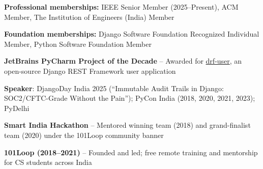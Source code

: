 
\begin{cvitems}
  \item \textbf{Professional memberships:} IEEE Senior Member (2025--Present), ACM Member, The Institution of Engineers (India) Member
  \item \textbf{Foundation memberships:} Django Software Foundation Recognized Individual Member, Python Software Foundation Member
  \item \textbf{JetBrains PyCharm Project of the Decade} -- Awarded for \href{https://github.com/101loop/drf-user}{drf-user}, an open-source Django REST Framework user application
  \item \textbf{Speaker}: DjangoDay India 2025 (``Immutable Audit Trails in Django: SOC2/CFTC-Grade Without the Pain''); PyCon India (2018, 2020, 2021, 2023); PyDelhi
  \item \textbf{Smart India Hackathon} -- Mentored winning team (2018) and grand-finalist team (2020) under the 101Loop community banner
  \item \textbf{101Loop (2018--2021)} -- Founded and led; free remote training and mentorship for CS students across India
\end{cvitems}
